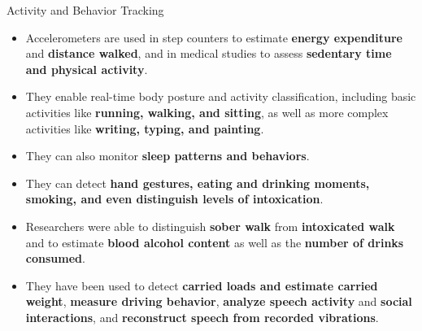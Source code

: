 \documentclass[ucs,9pt,usenames,dvipsnames]{beamer}
\begin{document}
\begin{frame}{Activity and Behavior Tracking}
\begin{itemize}
	\item Accelerometers are used in step counters to estimate \textbf{energy expenditure} and \textbf{distance walked}, and in medical studies to assess \textbf{sedentary time and physical activity}.
	\item They enable real-time body posture and activity
	classification, including basic activities like \textbf{running, walking,
	and sitting}, as well as more complex activities like \textbf{writing,
	typing, and painting}. 
	\item They can also monitor \textbf{sleep patterns
	and behaviors}. 
	\item They can detect \textbf{hand 	gestures, eating and drinking moments, smoking, and even
	distinguish levels of intoxication}. 
	\item Researchers were able to distinguish \textbf{sober walk}
	from \textbf{intoxicated walk} and to estimate \textbf{blood alcohol
	content} as well as the \textbf{number of drinks consumed}.
	\item They have been used to detect \textbf{carried loads and estimate carried weight}, \textbf{measure driving behavior}, \textbf{analyze speech activity} and \textbf{social interactions}, and
	\textbf{reconstruct speech from recorded vibrations}. 
\end{itemize}
\end{frame}
\end{document}

